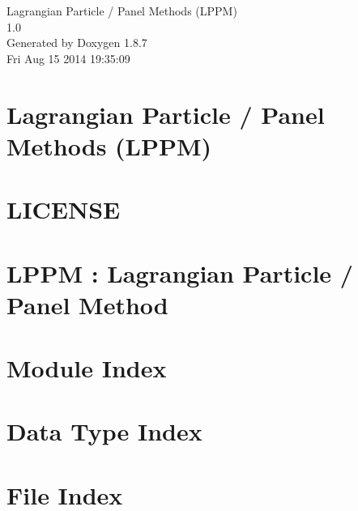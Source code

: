 \documentclass[twoside]{book}
\newcommand{\+}{\discretionary{\mbox{\scriptsize$\hookleftarrow$}}{}{}}
\newcommand{\clearemptydoublepage}{%
  \newpage{\pagestyle{empty}\cleardoublepage}%
}
\begin{document}
\hypersetup{pageanchor=false,
             bookmarks=true,
             bookmarksnumbered=true,
             pdfencoding=unicode
            }
\begin{titlepage}
\vspace*{7cm}
\begin{center}%
{\Large Lagrangian Particle / Panel Methods (L\+P\+P\+M) \\[1ex]\large 1.\+0 }\\
\vspace*{1cm}
{\large Generated by Doxygen 1.8.7}\\
\vspace*{0.5cm}
{\small Fri Aug 15 2014 19:35:09}\\
\end{center}
\end{titlepage}
\clearemptydoublepage
\tableofcontents
\clearemptydoublepage
{}
\hypersetup{pageanchor=true}

\chapter{Lagrangian Particle / Panel Methods (L\+P\+P\+M)}
\label{index}\hypertarget{index}{}
\chapter{L\+I\+C\+E\+N\+S\+E}
\label{md_LICENSE}
\hypertarget{md_LICENSE}{}

\chapter{L\+P\+P\+M \+: Lagrangian Particle / Panel Method}
\label{md_README}
\hypertarget{md_README}{}

\chapter{Module Index}

\chapter{Data Type Index}

\chapter{File Index}

\end{document}
